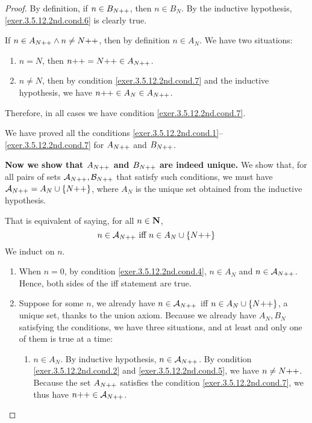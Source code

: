 \begin{proof}
	By definition, if $n \in B_{N{+}{+}}$, then $n \in B_N$. By the inductive hypothesis, \ref{exer.3.5.12.2nd.cond.6} is clearly true.
	
	If $n \in A_{N{+}{+}} \wedge n \ne N{+}{+}$, then by definition $n \in A_N$. We have two situations:
	\begin{enumerate}
		\item $n = N$, then $n{+}{+} = N{+}{+} \in A_{N{+}{+}}$.
		\item $n \ne N$, then by condition \ref{exer.3.5.12.2nd.cond.7} and the inductive hypothesis, we have $n{+}{+} \in A_N \in A_{N{+}{+}}$.
	\end{enumerate}
	Therefore, in all cases we have condition \ref{exer.3.5.12.2nd.cond.7}.
	
	We have proved all the conditions \ref{exer.3.5.12.2nd.cond.1}--\ref{exer.3.5.12.2nd.cond.7} for $A_{N{+}{+}}$ and $B_{N{+}{+}}$. 
	
	\textbf{Now we show that $A_{N{+}{+}}$ and $B_{N{+}{+}}$ are indeed unique.}
	\begingroup
	\def\anpp{{\cal A}_{\successor{N}}}%
	\def\bnpp{{\cal B}_{\successor{N}}}%
	We show that, for all pairs of sets $\anpp,\bnpp$ that satisfy such conditions, we must have $\anpp = A_N \cup \{\successor{N}\}$, where $A_N$ is the unique set obtained from the inductive hypothesis.
	
	That is equivalent of saying, for all $n \in \mathbf{N}$,
	\[
		n \in \anpp \hbox{ iff } n \in A_N \cup \{\successor{N}\}
	\]
	We induct on $n$.
	\begin{enumerate}
		\item \mybcbox When $n = 0$, by condition \ref{exer.3.5.12.2nd.cond.4}, $n \in A_N$ and $n \in \anpp$. Hence, both sides of the iff statement are true.
		
		\item \myisbox Suppose for some $n$, we already have $n \in \anpp$ iff $n \in A_N \cup \{N{+}{+}\}$, a unique set, thanks to the union axiom. Because we already have $A_N,B_N$ satisfying the conditions, we have three situations, and at least and only one of them is true at a time:
		\begin{enumerate}
			\item $n \in A_N$. By inductive hypothesis, $n \in \anpp$. By condition \ref{exer.3.5.12.2nd.cond.2} and \ref{exer.3.5.12.2nd.cond.5}, we have $n \ne N{+}{+}$. Because the set $A_{N{+}{+}}$ satisfies the condition \ref{exer.3.5.12.2nd.cond.7}, we thus have $\successor{n} \in \anpp$. 
			

\end{enumerate}
\end{enumerate}
\end{proof}
